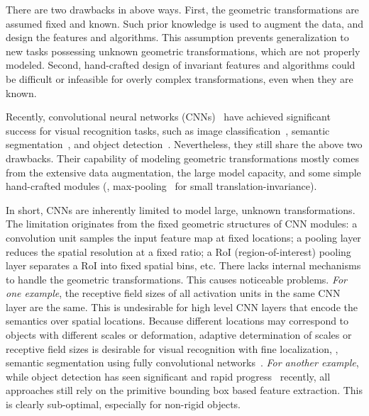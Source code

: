 \documentclass[10pt,twocolumn,letterpaper]{article}
\begin{document}
There are two drawbacks in above ways. First, the geometric transformations are assumed fixed and known. Such prior knowledge is used to augment the data, and design the features and algorithms. This assumption prevents generalization to new tasks possessing unknown geometric transformations, which are not properly modeled. Second, hand-crafted design of invariant features and algorithms could be difficult or infeasible for overly complex transformations, even when they are known.

Recently, convolutional neural networks (CNNs)~\cite{lecun1995convolutional} have achieved significant success for visual recognition tasks, such as image classification~\cite{krizhevsky2012imagenet}, semantic segmentation~\cite{long2015fully}, and object detection~\cite{girshick2014rich}. Nevertheless, they still share the above two drawbacks. Their capability of modeling geometric transformations mostly comes from the extensive data augmentation, the large model capacity, and some simple hand-crafted modules (\eg, max-pooling~\cite{boureau2010pooling} for small translation-invariance).

In short, CNNs are inherently limited to model large, unknown transformations. The limitation originates from the fixed geometric structures of CNN modules: a convolution unit samples the input feature map at fixed locations; a pooling layer reduces the spatial resolution at a fixed ratio; a RoI (region-of-interest) pooling layer separates a RoI into fixed spatial bins, etc. There lacks internal mechanisms to handle the geometric transformations. This causes noticeable problems. \emph{For one example}, the receptive field sizes of all activation units in the same CNN layer are the same. This is undesirable for high level CNN layers that encode the semantics over spatial locations. Because different locations may correspond to objects with different scales or deformation, adaptive determination of scales or receptive field sizes is desirable for visual recognition with fine localization, \eg, semantic segmentation using fully convolutional networks~\cite{long2015fully}. \emph{For another example}, while object detection has seen significant and rapid progress~\cite{girshick2014rich,szegedy2014scalable,girshick2015fast,ren2015faster,redmon2016you,liu2016ssd,dai2016rfcn} recently, all approaches still rely on the primitive bounding box based feature extraction. This is clearly sub-optimal, especially for non-rigid objects.
\end{document}
